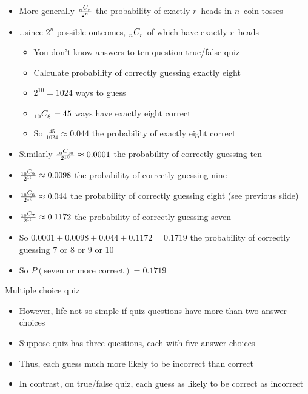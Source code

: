 \documentclass[handout,xcolor=dvipsnames]{beamer}
\theoremstyle{definition}
\newcommand\ncr[2]{\tensor[_{#1}]C{_{#2}}}
\begin{document}
\begin{frame}
\begin{itemize}
\item More generally $\frac{\ncr{n}{r}}{2^n}$ the probability
of exactly $r$~heads in $n$~coin tosses
\item \dots since $2^n$ possible outcomes, $\ncr{n}{r}$
of which have exactly $r$~heads
\begin{example}
\begin{itemize}
\item You don't know answers to ten-question true/false quiz
\item Calculate probability of correctly guessing exactly eight
\item $2^{10}=1024$ ways to guess
\item $\ncr{10}{8}=45$ ways have exactly eight correct
\item So $\frac{45}{1024}\approx 0.044$ the probability
of exactly eight correct
\end{itemize}
\end{example}
\end{itemize}
\end{frame}

\begin{frame}
\begin{itemize}
\item Similarly
$\frac{\ncr{10}{10}}{2^{10}}\approx 0.0001$
the probability of correctly guessing ten
\item $\frac{\ncr{10}{9}}{2^{10}}\approx 0.0098$
the probability of correctly guessing nine
\item $\frac{\ncr{10}{8}}{2^{10}}\approx 0.044$
the probability of correctly guessing eight (see previous slide)
\item $\frac{\ncr{10}{7}}{2^{10}}\approx 0.1172$
the probability of correctly guessing seven
\item So $0.0001+0.0098+0.044+0.1172=0.1719$
the probability of correctly guessing $7$ or $8$ or $9$ or $10$
\item So $P\left(\text{seven or more correct}\right)=0.1719$
\end{itemize}
\end{frame}

\begin{frame}{Multiple choice quiz}
\begin{itemize}
\item However, life not so simple if quiz questions have
more than two answer choices
\item Suppose quiz has three questions, each with five answer choices
\item Thus, each guess much more likely to be incorrect than correct
\item In contrast, on true/false quiz, each guess as likely
to be correct as incorrect
\end{itemize}
\end{frame}
\end{document}

